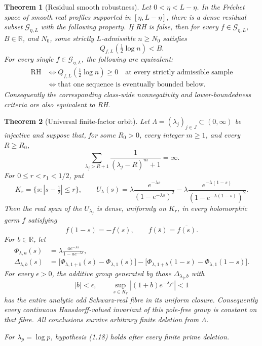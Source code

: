 \documentclass[11pt]{article}
\newtheorem{theorem}{Theorem}[section]
\newcommand{\R}{\mathbb R}
\newcommand{\cG}{\mathcal G}
\begin{document}
\begin{theorem}[Residual smooth robustness]\label{thm:smooth-main}
Let \(0<\eta<L-\eta\).  In the Fr\'echet space of smooth real profiles supported in
\([\eta,L-\eta]\), there is a dense residual subset \(\cG_{\eta,L}\) with the following property.
If RH is false, then for every \(f\in\cG_{\eta,L}\), \(B\in\R\), and \(N_0\), some
strictly \(L\)-admissible \(n\ge N_0\) satisfies
\[
 Q_{f,L}\!\left(\tfrac12\log n\right)<B.
\tag{1.16}
\]
For every single \(f\in\cG_{\eta,L}\), the following are equivalent:
\[
\begin{aligned}
\mathrm{RH}
&\Longleftrightarrow
Q_{f,L}\!\left(\tfrac12\log n\right)\ge0
\quad\text{at every strictly admissible sample}\\
&\Longleftrightarrow
\text{that one sequence is eventually bounded below}.
\end{aligned}
\tag{1.17}
\]
Consequently the corresponding class-wide nonnegativity and lower-boundedness criteria are also
equivalent to RH.
\end{theorem}

\begin{theorem}[Universal finite-factor orbit]\label{thm:local-orbit}
Let \(\Lambda=(\lambda_j)_{j\in J}\subset(0,\infty)\) be injective and suppose that, for
some \(R_0>0\), every integer \(m\ge1\), and every \(R\ge R_0\),
\[
 \sum_{\lambda_j>R+1}\frac1{(\lambda_j-R)^m+1}=\infty.
\tag{1.18}
\]
For \(0\le r<r_1<1/2\), put
\[
 K_r=\{s:|s-\tfrac12|\le r\},\qquad
 U_\lambda(s)=
 \lambda\frac{e^{-\lambda s}}{(1-e^{-\lambda s})^2}
 -
 \lambda\frac{e^{-\lambda(1-s)}}{(1-e^{-\lambda(1-s)})^2}.
\tag{1.19}
\]
Then the real span of the \(U_{\lambda_j}\) is dense, uniformly on \(K_r\), in every
holomorphic germ \(f\) satisfying
\[
 f(1-s)=-f(s),\qquad f(\overline s)=\overline{f(s)}.
\tag{1.20}
\]
For \(b\in\R\), let
\[
\begin{aligned}
 \Phi_{\lambda,a}(s)&=\lambda\frac{ae^{-\lambda s}}{1-ae^{-\lambda s}},\\
 \Delta_{\lambda,b}(s)
 &=\bigl[\Phi_{\lambda,1+b}(s)-\Phi_{\lambda,1}(s)\bigr]
  -\bigl[\Phi_{\lambda,1+b}(1-s)-\Phi_{\lambda,1}(1-s)\bigr].
\end{aligned}
\tag{1.21}
\]
For every \(\epsilon>0\), the additive group generated by those
\(\Delta_{\lambda_j,b}\) with
\[
 |b|<\epsilon,\qquad
 \sup_{s\in K_r}|(1+b)e^{-\lambda_j s}|<1
\tag{1.22}
\]
has the entire analytic odd Schwarz-real fibre in its uniform closure.  Consequently every
continuous Hausdorff-valued invariant of this pole-free group is constant on that fibre.
All conclusions survive arbitrary finite deletion from \(\Lambda\).

For \(\lambda_p=\log p\), hypothesis (1.18) holds after every finite prime deletion.
\end{theorem}
\end{document}
